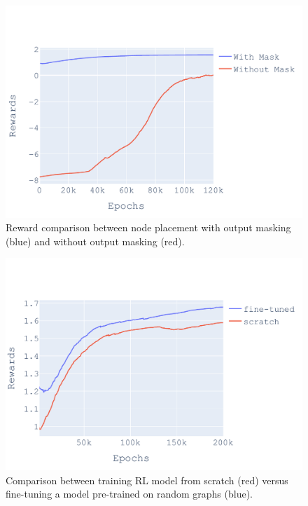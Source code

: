

\begin{figure}[tbh]
  \centering
  \includegraphics[trim=0 0 0 50, clip, width=0.7\linewidth]{fig/ifft_masked_nomask.pdf}
  \caption{Reward comparison between node placement with output masking (blue) and without output masking (red).}
  \label{fig:mask_nomask}
\end{figure}

\begin{figure}[tbh]
  \centering
  \includegraphics[width=0.7\linewidth]{fig/pretrain_ifft.pdf}
  \caption{Comparison between training RL model from scratch (red) versus fine-tuning a model pre-trained on random graphs (blue). }
  \label{fig:pretrain_ifft}
\end{figure}

